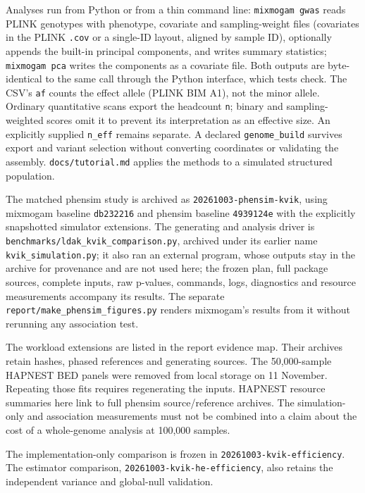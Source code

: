 \documentclass[11pt]{article}
\newcommand{\code}[1]{\texttt{#1}}
\begin{document}
Analyses run from Python or from a thin command line: \code{mixmogam gwas}
reads PLINK genotypes with phenotype, covariate and sampling-weight files
(covariates in the PLINK \code{.cov} or a single-ID layout, aligned by
sample ID), optionally appends the built-in principal components, and
writes summary statistics; \code{mixmogam pca}
writes the components as a covariate file. Both outputs are byte-identical
to the same call through the Python interface, which tests check.
The CSV's \code{af} counts the effect allele (PLINK BIM A1), not the
minor allele. Ordinary quantitative scans export the headcount
\code{n}; binary and sampling-weighted scores omit it to prevent its
interpretation as an effective size. An explicitly supplied \code{n\_eff}
remains separate. A declared \code{genome\_build} survives export and
variant selection without converting coordinates or validating the assembly.
\code{docs/tutorial.md} applies the methods to a simulated structured
population.

The matched phensim study is archived as \code{20261003-phensim-kvik},
using mixmogam baseline \code{db232216} and phensim baseline
\code{4939124e} with the explicitly snapshotted simulator extensions.
The generating and analysis driver is
\code{benchmarks/}\allowbreak\code{ldak\_kvik\_comparison.py}, archived under
its earlier name \code{kvik\_simulation.py}; it also ran an external program,
whose outputs stay in the archive for provenance and are not used here;
the frozen plan, full package sources, complete inputs, raw p-values,
commands, logs, diagnostics and resource measurements accompany its results.
The separate \code{report/}\allowbreak\code{make\_phensim\_figures.py}
renders mixmogam's results from it without rerunning any association test.

The workload extensions are listed in the report evidence map. Their
archives retain hashes, phased references and generating sources. The
50,000-sample HAPNEST BED panels were removed from local storage on
11 November. Repeating those fits requires regenerating the inputs.
HAPNEST resource summaries here link to full phensim source/reference
archives. The simulation-only and association
measurements must not be combined into a claim about the cost of a
whole-genome analysis at 100,000 samples.

The implementation-only comparison is frozen in
\code{20261003-kvik-efficiency}. The estimator comparison,
\code{20261003-kvik-he-efficiency}, also retains the independent variance
and global-null validation.
\end{document}
